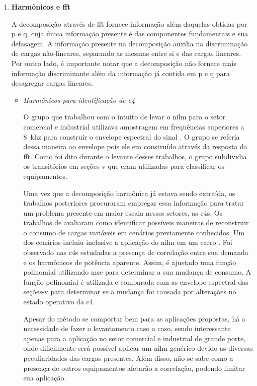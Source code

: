 \begin{enumerate}[label=\textbf{2.\arabic*},wide=\parindent]
\item \textbf{Harmônicos e \gls{fft}}
\label{nilm:harmonic_fft}

A decomposição através de \gls{fft} fornece informação além daquelas
obtidas por \gls{p} e \gls{q}, cuja única informação presente é das
componentes fundamentais e sua defasagem. A informação presente na
decomposição auxilia na discriminação de cargas não-lineares,
separando as mesmas entre si e das cargas lineares. Por outro lado, é
importante notar que a decomposição não fornece mais informação
discriminante além da informação já contida em \gls{p} e \gls{q} para
desagregar cargas lineares.

\begin{itemize}[wide=\parindent]
\item \emph{Harmônicos para identificação de \acs{c4}}

O grupo que trabalhou com o intuito de levar o \gls{nilm} para o setor
comercial e industrial \cite{nilm_norford_leeb_medianfilt_1996_13,
nilm_leeb_spectral_envelope_1995_23} utilizava amostragem em
frequências superiores a 8~k\acs{hz} para construir o envelope
espectral do sinal \cite{nilm_laughman_continuous_variables_2003_9}. O
grupo se referia dessa maneira ao envelope pois ele era construído
através da resposta da \gls{fft}. Como foi dito durante o levante
desses trabalhos, o grupo subdividia os transitórios em seções-v que
eram utilizadas para classificar os equipamentos.

Uma vez que a decomposição harmônica já estava sendo extraída, os
trabalhos posteriores procuraram empregar essa informação para tratar
um problema presente em maior escala nesses setores, as \glspl{c4}.
Os trabalhos de \citet{nilm_lee_variable_speed_estimation_2005_24,
nilm_wichakool_2009_25,nilm_shaw_2008_26} avaliaram como identificar
possíveis maneiras de reconstruir o consumo de cargas variáveis
em cenários previamente conhecidos. Um dos cenários incluiu inclusive
a aplicação do \gls{nilm} em um carro \cite{nilm_shaw_2008_26}.
Foi observado nas \glspl{c4} estudadas a presença de correlação entre
sua demanda e os harmônicos de potência aparente. Assim, é ajustado
uma função polinomial utilizando \gls{mse} para determinar a sua
mudança de consumo. A função polinomial é utilizada e comparada com as
envelope espectral das seções-v para determinar se a mudança foi
causada por alterações no estado operativo da \gls{c4}.

Apesar do método se comportar bem para as aplicações propostas,
há a necessidade de fazer o levantamento caso a caso, sendo
interessante apenas para a aplicação no setor comercial e industrial
de grande porte, onde dificilmente será possível aplicar um \gls{nilm}
genérico devido as diversas peculiaridades das cargas presentes. Além
disso, não se sabe como a presença de outros equipamentos afetarão a
correlação, podendo limitar sua aplicação.


\end{itemize}
\end{enumerate}
